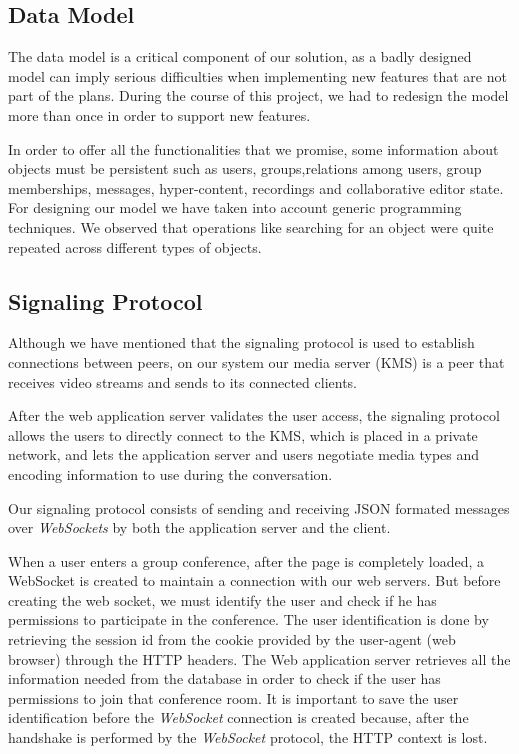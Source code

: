 \documentclass[conference,compsoc,a4paper]{IEEEtran}
\begin{document}
\subsection{Data Model}

The data model is a critical component of our solution, as a badly designed model can imply serious difficulties when implementing new features that are not part of the plans. During the course of this project, we had to redesign the model more than once in order to support new features.

In order to offer all the functionalities that we promise, some information about objects must be persistent such as users, groups,relations among users, group memberships, messages, hyper-content, recordings and collaborative editor state. For designing our model we have taken into account generic programming techniques. We observed that operations like searching for an object were quite repeated across different types of objects. 

\subsection{Signaling Protocol}


Although we have mentioned that the signaling protocol is used to establish connections between peers, on our system our media server (\gls{KMS}) is a peer that receives video streams and sends to its connected clients. 

After the web application server validates the user access, the signaling protocol allows the users to directly connect to the \gls{KMS}, which is placed in a private network, and lets the application server and users negotiate media types and encoding information to use during the conversation.

Our signaling protocol consists of sending and receiving \gls{JSON} formated messages over \emph{WebSockets} by both the application server and the client. 


When a user enters a group conference, after the page is completely loaded, a WebSocket is created to maintain a connection with our web servers. 
But before creating the web socket, we must identify the user and check if he has permissions to participate in the conference. The user identification is done by retrieving the session id from the cookie provided by the user-agent (web browser) through the \gls{HTTP} headers.
The Web application server retrieves all the information needed from the database in order to check if the user has permissions to join that conference room. It is important to save the user identification before the \emph{WebSocket} connection is created because, after the handshake is performed by the \emph{WebSocket} protocol\cite{rfc6455}, the \gls{HTTP} context is lost.
\end{document}
